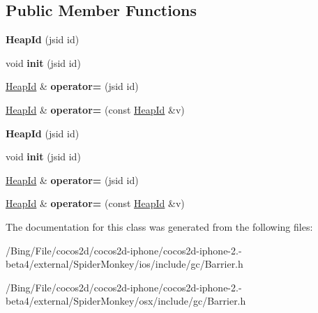 \subsection*{Public Member Functions}
\begin{DoxyCompactItemize}
\item 
\hypertarget{classjs_1_1_heap_id_adb0cd91d4e9a8862149d54c5e38a3f78}{{\bfseries Heap\-Id} (jsid id)}\label{classjs_1_1_heap_id_adb0cd91d4e9a8862149d54c5e38a3f78}

\item 
\hypertarget{classjs_1_1_heap_id_a52ac238dab446074f1bcad5c98f05154}{void {\bfseries init} (jsid id)}\label{classjs_1_1_heap_id_a52ac238dab446074f1bcad5c98f05154}

\item 
\hypertarget{classjs_1_1_heap_id_a0b8efca73952110d46e3cdb80373cd58}{\hyperlink{classjs_1_1_heap_id}{Heap\-Id} \& {\bfseries operator=} (jsid id)}\label{classjs_1_1_heap_id_a0b8efca73952110d46e3cdb80373cd58}

\item 
\hypertarget{classjs_1_1_heap_id_a7b017cab6b6a1b38f4acd682e6e97635}{\hyperlink{classjs_1_1_heap_id}{Heap\-Id} \& {\bfseries operator=} (const \hyperlink{classjs_1_1_heap_id}{Heap\-Id} \&v)}\label{classjs_1_1_heap_id_a7b017cab6b6a1b38f4acd682e6e97635}

\item 
\hypertarget{classjs_1_1_heap_id_adb0cd91d4e9a8862149d54c5e38a3f78}{{\bfseries Heap\-Id} (jsid id)}\label{classjs_1_1_heap_id_adb0cd91d4e9a8862149d54c5e38a3f78}

\item 
\hypertarget{classjs_1_1_heap_id_a52ac238dab446074f1bcad5c98f05154}{void {\bfseries init} (jsid id)}\label{classjs_1_1_heap_id_a52ac238dab446074f1bcad5c98f05154}

\item 
\hypertarget{classjs_1_1_heap_id_a0b8efca73952110d46e3cdb80373cd58}{\hyperlink{classjs_1_1_heap_id}{Heap\-Id} \& {\bfseries operator=} (jsid id)}\label{classjs_1_1_heap_id_a0b8efca73952110d46e3cdb80373cd58}

\item 
\hypertarget{classjs_1_1_heap_id_a7b017cab6b6a1b38f4acd682e6e97635}{\hyperlink{classjs_1_1_heap_id}{Heap\-Id} \& {\bfseries operator=} (const \hyperlink{classjs_1_1_heap_id}{Heap\-Id} \&v)}\label{classjs_1_1_heap_id_a7b017cab6b6a1b38f4acd682e6e97635}

\end{DoxyCompactItemize}


The documentation for this class was generated from the following files\-:\begin{DoxyCompactItemize}
\item 
/\-Bing/\-File/cocos2d/cocos2d-\/iphone/cocos2d-\/iphone-\/2.-\/beta4/external/\-Spider\-Monkey/ios/include/gc/Barrier.\-h\item 
/\-Bing/\-File/cocos2d/cocos2d-\/iphone/cocos2d-\/iphone-\/2.-\/beta4/external/\-Spider\-Monkey/osx/include/gc/Barrier.\-h\end{DoxyCompactItemize}
